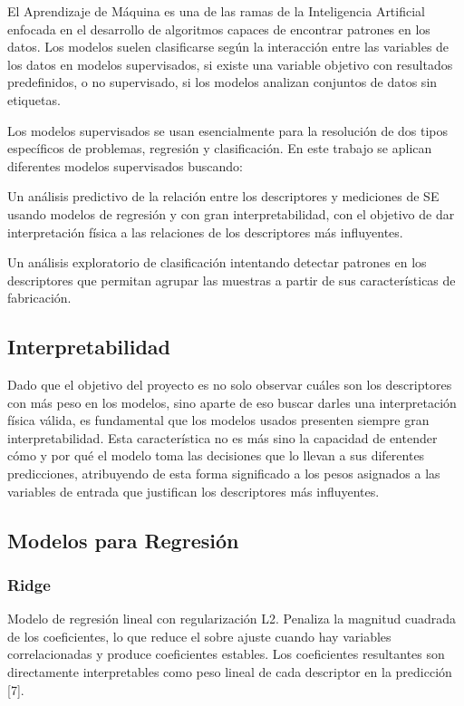 El Aprendizaje de Máquina es una de las ramas de la Inteligencia Artificial enfocada en el desarrollo de algoritmos capaces de encontrar patrones en los datos. Los modelos suelen clasificarse según la interacción entre las variables de los datos en modelos supervisados, si existe una variable objetivo con resultados predefinidos, o no supervisado, si los modelos analizan conjuntos de datos sin etiquetas.

Los modelos supervisados se usan esencialmente para la resolución de dos tipos específicos de problemas, regresión y clasificación. En este trabajo se aplican diferentes modelos supervisados buscando: 

Un análisis predictivo de la relación entre los descriptores y mediciones de SE usando modelos de regresión y con gran interpretabilidad, con el objetivo de dar interpretación física a las relaciones de los descriptores más influyentes.

Un análisis exploratorio de clasificación intentando detectar patrones en los descriptores que permitan agrupar las muestras a partir de sus características de fabricación. 

\subsection{Interpretabilidad}
Dado que el objetivo del proyecto es no solo observar cuáles son los descriptores con más peso en los modelos, sino aparte de eso buscar darles una interpretación física válida, es fundamental que los modelos usados presenten siempre gran interpretabilidad.
Esta característica no es más sino la capacidad de entender cómo y por qué el modelo toma las decisiones que lo llevan a sus diferentes predicciones, atribuyendo de esta forma significado a los pesos asignados a las variables de entrada que justifican los descriptores más influyentes.


\subsection{Modelos para Regresión}

\subsubsection{Ridge}
Modelo de regresión lineal con regularización L2. Penaliza la magnitud cuadrada de los coeficientes, lo que reduce el sobre ajuste cuando hay variables correlacionadas y produce coeficientes estables. Los coeficientes resultantes son directamente interpretables como peso lineal de cada descriptor en la predicción [7].


